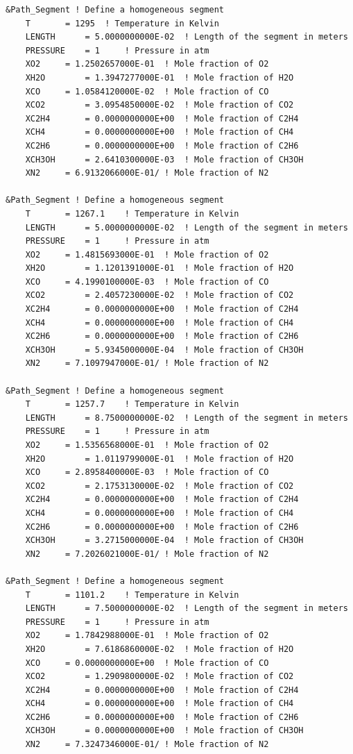 \begin{lstlisting}
&Path_Segment ! Define a homogeneous segment
	T		= 1295	! Temperature in Kelvin
	LENGTH		= 5.0000000000E-02	! Length of the segment in meters
	PRESSURE	= 1		! Pressure in atm
	XO2		= 1.2502657000E-01	! Mole fraction of O2
	XH2O		= 1.3947277000E-01	! Mole fraction of H2O
	XCO		= 1.0584120000E-02	! Mole fraction of CO
	XCO2		= 3.0954850000E-02	! Mole fraction of CO2
	XC2H4		= 0.0000000000E+00	! Mole fraction of C2H4
	XCH4		= 0.0000000000E+00	! Mole fraction of CH4
	XC2H6		= 0.0000000000E+00	! Mole fraction of C2H6
	XCH3OH		= 2.6410300000E-03	! Mole fraction of CH3OH
	XN2		= 6.9132066000E-01/	! Mole fraction of N2

&Path_Segment ! Define a homogeneous segment
	T		= 1267.1	! Temperature in Kelvin
	LENGTH		= 5.0000000000E-02	! Length of the segment in meters
	PRESSURE	= 1		! Pressure in atm
	XO2		= 1.4815693000E-01	! Mole fraction of O2
	XH2O		= 1.1201391000E-01	! Mole fraction of H2O
	XCO		= 4.1990100000E-03	! Mole fraction of CO
	XCO2		= 2.4057230000E-02	! Mole fraction of CO2
	XC2H4		= 0.0000000000E+00	! Mole fraction of C2H4
	XCH4		= 0.0000000000E+00	! Mole fraction of CH4
	XC2H6		= 0.0000000000E+00	! Mole fraction of C2H6
	XCH3OH		= 5.9345000000E-04	! Mole fraction of CH3OH
	XN2		= 7.1097947000E-01/	! Mole fraction of N2

&Path_Segment ! Define a homogeneous segment
	T		= 1257.7	! Temperature in Kelvin
	LENGTH		= 8.7500000000E-02	! Length of the segment in meters
	PRESSURE	= 1		! Pressure in atm
	XO2		= 1.5356568000E-01	! Mole fraction of O2
	XH2O		= 1.0119799000E-01	! Mole fraction of H2O
	XCO		= 2.8958400000E-03	! Mole fraction of CO
	XCO2		= 2.1753130000E-02	! Mole fraction of CO2
	XC2H4		= 0.0000000000E+00	! Mole fraction of C2H4
	XCH4		= 0.0000000000E+00	! Mole fraction of CH4
	XC2H6		= 0.0000000000E+00	! Mole fraction of C2H6
	XCH3OH		= 3.2715000000E-04	! Mole fraction of CH3OH
	XN2		= 7.2026021000E-01/	! Mole fraction of N2

&Path_Segment ! Define a homogeneous segment
	T		= 1101.2	! Temperature in Kelvin
	LENGTH		= 7.5000000000E-02	! Length of the segment in meters
	PRESSURE	= 1		! Pressure in atm
	XO2		= 1.7842988000E-01	! Mole fraction of O2
	XH2O		= 7.6186860000E-02	! Mole fraction of H2O
	XCO		= 0.0000000000E+00	! Mole fraction of CO
	XCO2		= 1.2909800000E-02	! Mole fraction of CO2
	XC2H4		= 0.0000000000E+00	! Mole fraction of C2H4
	XCH4		= 0.0000000000E+00	! Mole fraction of CH4
	XC2H6		= 0.0000000000E+00	! Mole fraction of C2H6
	XCH3OH		= 0.0000000000E+00	! Mole fraction of CH3OH
	XN2		= 7.3247346000E-01/	! Mole fraction of N2
 \end{lstlisting}



